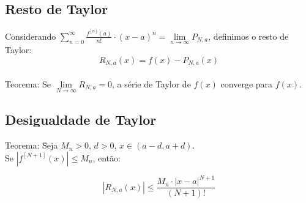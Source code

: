 \documentclass{article}
\begin{document}
\subsection{Resto de Taylor}

Considerando $\sum\limits_{n=0}^{\infty} \frac{f^{[n]}(a)}{n!} \cdot {(x - a)}^n = \lim\limits_{n\to\infty} P_{N,a}$, definimos o resto de Taylor:
\[ R_{N,a}(x) = f(x) - P_{N,a}(x) \]
\\
Teorema: Se $\lim\limits_{N\to\infty} R_{N,a} = 0$, a s\'erie de Taylor de $f(x)$ converge para $f(x)$.

\subsection{Desigualdade de Taylor}

\begin{tabbing}
Teorema: \=Seja $M_n > 0$, $d > 0$, $x \in (a - d, a + d)$. \\[5pt]
\>Se $|f^{[N + 1]}(x)| \leq M_n$, ent\~ao:
\end{tabbing}
\[ |R_{N,a}(x)| \leq \frac{M_n \cdot {|x - a|}^{N+1}}{(N+1)!} \]
\end{document}
